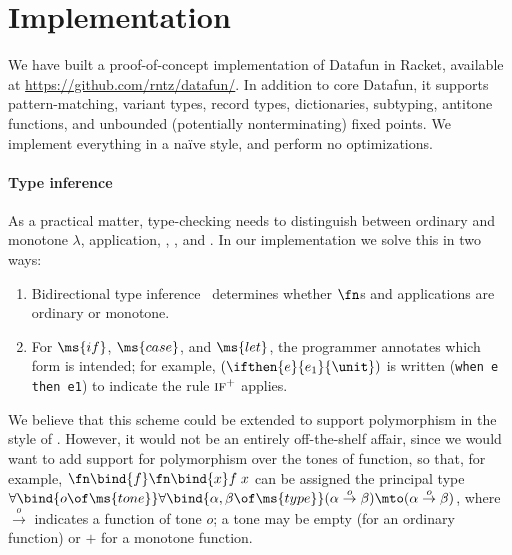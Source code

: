 \section{Implementation}
We have built a proof-of-concept implementation of Datafun in Racket, available
at \url{https://github.com/rntz/datafun/}. In addition to core Datafun,
it supports pattern-matching, variant types, record types, dictionaries,
subtyping, antitone functions, and unbounded (potentially nonterminating) fixed
points. We implement everything in a na\"ive style, and perform no
optimizations.

\paragraph{Type inference}
As a practical matter, type-checking needs to distinguish between ordinary and
monotone $\lambda$, application, , , and . In our
implementation we solve this in two ways:
\begin{enumerate}
\item Bidirectional type inference~\cite{bidirectional} determines whether
  $\fn$s and applications are ordinary or monotone.

\item For $\ms{if}$, $\ms{case}$, and $\ms{let}$, the programmer annotates which
  form is intended; for example, $(\ifthen{e}{e_1}{\unit})$ is written
  (\texttt{when e then e1}) to indicate the rule $\textsc{if}^+$ applies.
\end{enumerate}

We believe that this scheme could be extended to support polymorphism
in the style of \citet{dunfield-bidir}. However, it would not be an
entirely off-the-shelf affair, since we would want to add support for
polymorphism over the tones of function, so that, for example,
$\fn\bind{f}\fn\bind{x} f\;x$ can be assigned the principal type
$\forall\bind{o\of\ms{tone}}\forall\bind{\alpha,\beta \of \ms{type}}
(\alpha \overset{o}\to \beta) \mto (\alpha \overset{o}\to \beta)$,
where $\overset{o}\to$ indicates a function of tone $o$; a tone may be
empty (for an ordinary function) or ${+}$ for a monotone function.

% 
% 

